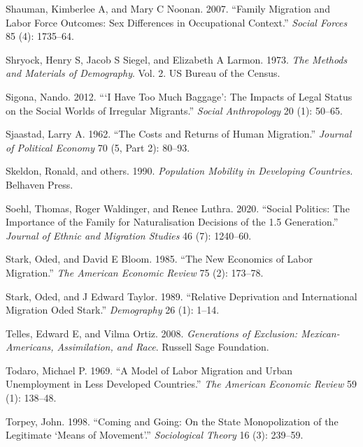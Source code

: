 \documentclass[
]{article}
\begin{document}
\leavevmode\hypertarget{ref-shauman2007family}{}%
Shauman, Kimberlee A, and Mary C Noonan. 2007. ``Family Migration and
Labor Force Outcomes: Sex Differences in Occupational Context.''
\emph{Social Forces} 85 (4): 1735--64.

\leavevmode\hypertarget{ref-shryock1973methods}{}%
Shryock, Henry S, Jacob S Siegel, and Elizabeth A Larmon. 1973.
\emph{The Methods and Materials of Demography}. Vol. 2. US Bureau of the
Census.

\leavevmode\hypertarget{ref-sigona2012have}{}%
Sigona, Nando. 2012. ```I Have Too Much Baggage': The Impacts of Legal
Status on the Social Worlds of Irregular Migrants.'' \emph{Social
Anthropology} 20 (1): 50--65.

\leavevmode\hypertarget{ref-sjaastad1962costs}{}%
Sjaastad, Larry A. 1962. ``The Costs and Returns of Human Migration.''
\emph{Journal of Political Economy} 70 (5, Part 2): 80--93.

\leavevmode\hypertarget{ref-skeldon1990population}{}%
Skeldon, Ronald, and others. 1990. \emph{Population Mobility in
Developing Countries.} Belhaven Press.

\leavevmode\hypertarget{ref-soehl2020social}{}%
Soehl, Thomas, Roger Waldinger, and Renee Luthra. 2020. ``Social
Politics: The Importance of the Family for Naturalisation Decisions of
the 1.5 Generation.'' \emph{Journal of Ethnic and Migration Studies} 46
(7): 1240--60.

\leavevmode\hypertarget{ref-stark1985new}{}%
Stark, Oded, and David E Bloom. 1985. ``The New Economics of Labor
Migration.'' \emph{The American Economic Review} 75 (2): 173--78.

\leavevmode\hypertarget{ref-stark1989relative}{}%
Stark, Oded, and J Edward Taylor. 1989. ``Relative Deprivation and
International Migration Oded Stark.'' \emph{Demography} 26 (1): 1--14.

\leavevmode\hypertarget{ref-telles2008generations}{}%
Telles, Edward E, and Vilma Ortiz. 2008. \emph{Generations of Exclusion:
Mexican-Americans, Assimilation, and Race}. Russell Sage Foundation.

\leavevmode\hypertarget{ref-todaro1969model}{}%
Todaro, Michael P. 1969. ``A Model of Labor Migration and Urban
Unemployment in Less Developed Countries.'' \emph{The American Economic
Review} 59 (1): 138--48.

\leavevmode\hypertarget{ref-torpey1998coming}{}%
Torpey, John. 1998. ``Coming and Going: On the State Monopolization of
the Legitimate `Means of Movement'.'' \emph{Sociological Theory} 16 (3):
239--59.
\end{document}
